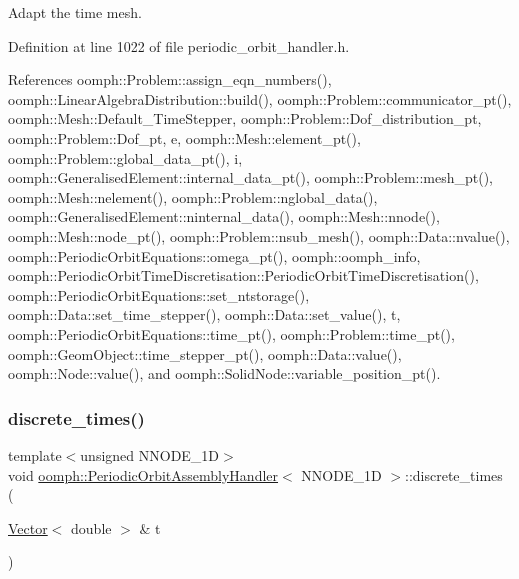 Adapt the time mesh. 



Definition at line 1022 of file periodic\+\_\+orbit\+\_\+handler.\+h.



References oomph\+::\+Problem\+::assign\+\_\+eqn\+\_\+numbers(), oomph\+::\+Linear\+Algebra\+Distribution\+::build(), oomph\+::\+Problem\+::communicator\+\_\+pt(), oomph\+::\+Mesh\+::\+Default\+\_\+\+Time\+Stepper, oomph\+::\+Problem\+::\+Dof\+\_\+distribution\+\_\+pt, oomph\+::\+Problem\+::\+Dof\+\_\+pt, e, oomph\+::\+Mesh\+::element\+\_\+pt(), oomph\+::\+Problem\+::global\+\_\+data\+\_\+pt(), i, oomph\+::\+Generalised\+Element\+::internal\+\_\+data\+\_\+pt(), oomph\+::\+Problem\+::mesh\+\_\+pt(), oomph\+::\+Mesh\+::nelement(), oomph\+::\+Problem\+::nglobal\+\_\+data(), oomph\+::\+Generalised\+Element\+::ninternal\+\_\+data(), oomph\+::\+Mesh\+::nnode(), oomph\+::\+Mesh\+::node\+\_\+pt(), oomph\+::\+Problem\+::nsub\+\_\+mesh(), oomph\+::\+Data\+::nvalue(), oomph\+::\+Periodic\+Orbit\+Equations\+::omega\+\_\+pt(), oomph\+::oomph\+\_\+info, oomph\+::\+Periodic\+Orbit\+Time\+Discretisation\+::\+Periodic\+Orbit\+Time\+Discretisation(), oomph\+::\+Periodic\+Orbit\+Equations\+::set\+\_\+ntstorage(), oomph\+::\+Data\+::set\+\_\+time\+\_\+stepper(), oomph\+::\+Data\+::set\+\_\+value(), t, oomph\+::\+Periodic\+Orbit\+Equations\+::time\+\_\+pt(), oomph\+::\+Problem\+::time\+\_\+pt(), oomph\+::\+Geom\+Object\+::time\+\_\+stepper\+\_\+pt(), oomph\+::\+Data\+::value(), oomph\+::\+Node\+::value(), and oomph\+::\+Solid\+Node\+::variable\+\_\+position\+\_\+pt().

\mbox{\label{classoomph_1_1PeriodicOrbitAssemblyHandler_a555a59c5c5b5dd2e08a31f6c6e176611}} 
\subsubsection{\texorpdfstring{discrete\+\_\+times()}{discrete\_times()}}
{\footnotesize\ttfamily template$<$unsigned N\+N\+O\+D\+E\+\_\+1D$>$ \\
void \hyperlink{classoomph_1_1PeriodicOrbitAssemblyHandler}{oomph\+::\+Periodic\+Orbit\+Assembly\+Handler}$<$ N\+N\+O\+D\+E\+\_\+1D $>$\+::discrete\+\_\+times (\begin{DoxyParamCaption}\item[{\hyperlink{classoomph_1_1Vector}{Vector}$<$ double $>$ \&}]{t }\end{DoxyParamCaption})\hspace{0.3cm}{\ttfamily [inline]}}



